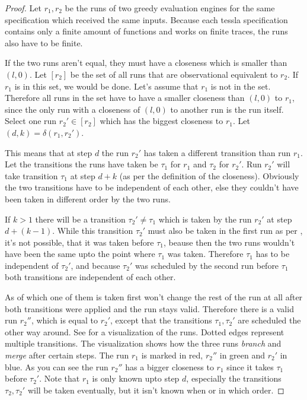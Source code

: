 \begin{proof}\label{proof:equiv_greedy_engines}
  Let \(r_1, r_2\) be the runs of two greedy evaluation engines for the same specification which received the same inputs.
  Because each \gls{tessla} specification contains only a finite amount of functions and works on finite traces, the runs also have to be finite.

  If the two runs aren't equal, they must have a closeness which is smaller than \((l, 0)\).
  Let \([r_2]\) be the set of all runs that are observational equivalent to \(r_2\).
  If \(r_1\) is in this set, we would be done.
  Let's assume that \(r_1\) is not in the set.
  Therefore all runs in the set have to have a smaller closeness than \((l,0)\) to \(r_1\), since the only run with a closeness of \((l,0)\) to another run is the run itself.
  Select one run \(r_2' \in [r_2]\) which has the biggest closeness to \(r_1\).
  Let \((d,k) = \delta(r_1, r_2')\).

  This means that at step \(d\) the run \(r_2'\) has taken a different transition than run \(r_1\).
  Let the transitions the runs have taken be \(\tau_1\) for \(r_1\) and \(\tau_2\) for \(r_2'\).
  Run \(r_2'\) will take transition \(\tau_1\) at step \(d+k\) (as per the definition of the closeness).
  Obviously the two transitions have to be independent of each other, else they couldn't have been taken in different order by the two runs.

  If \(k > 1\) there will be a transition \(\tau_2' \neq \tau_1\) which is taken by the run \(r_2'\) at step \(d+(k-1)\).
  While this transition \(\tau_2'\) must also be taken in the first run as per , it's not possible, that it was taken before \(\tau_1\), beause then the two runs wouldn't have been the same upto the point where \(\tau_1\) was taken.
  Therefore \(\tau_1\) has to be independent of \(\tau_2'\), and because \(\tau_2'\) was scheduled by the second run before \(\tau_1\) both transitions are independent of each other.

  As of  which one of them is taken first won't change the rest of the run at all after both transitions were applied and the run stays valid.
  Therefore there is a valid run \(r_2''\), which is equal to \(r_2'\), except that the transitions \(\tau_1, \tau_2'\) are scheduled the other way around.
  See  for a visualization of the runs.
  Dotted edges represent multiple transitions. The visualization shows how the three runs \emph{branch} and \emph{merge} after certain steps.
  The run \(r_1\) is marked in red, \(r_2''\) in green and \(r_2'\) in blue.
  As you can see the run \(r_2''\) has a bigger closeness to \(r_1\) since it takes \(\tau_1\) before \(\tau_2'\).
  Note that \(r_1\) is only known upto step \(d\), especially the transitions \(\tau_2, \tau_2'\) will be taken eventually, but it isn't known when or in which order.


\end{proof}
